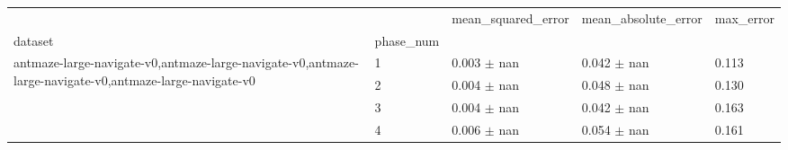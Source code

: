 \begin{tabular}{lllll}
\toprule
 &  & mean_squared_error & mean_absolute_error & max_error \\
dataset & phase_num &  &  &  \\
\midrule
\multirow[t]{4}{*}{antmaze-large-navigate-v0,antmaze-large-navigate-v0,antmaze-large-navigate-v0,antmaze-large-navigate-v0} & 1 & 0.003 $\pm$ nan & 0.042 $\pm$ nan & 0.113 \\
 & 2 & 0.004 $\pm$ nan & 0.048 $\pm$ nan & 0.130 \\
 & 3 & 0.004 $\pm$ nan & 0.042 $\pm$ nan & 0.163 \\
 & 4 & 0.006 $\pm$ nan & 0.054 $\pm$ nan & 0.161 \\
\cline{1-5}
\bottomrule
\end{tabular}
